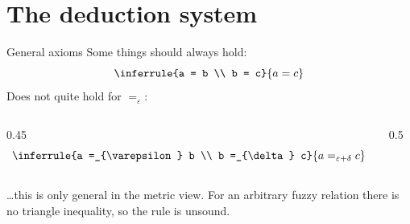 \documentclass[10pt,aspectratio=169]{beamer}
\newcommand{\qeq}[1]{=_{#1}}
\newcommand{\eps}{\varepsilon}
\begin{document}
\section{The deduction system}

\begin{frame}{General axioms}
  Some things should always hold:
  \[
    \inferrule{a = b \\ b = c}{a = c}
  \]
  \vfill
  \pause
  Does not quite hold for $\qeq{\eps}$:
  \begin{columns}[c]
    \begin{column}{0.45\textwidth}
      \[
        \inferrule{a \qeq{\eps} b \\ b \qeq{\delta} c}
                  {a \qeq{\eps + \delta} c}
      \]
    \end{column}
    \begin{column}{0.5\textwidth}
      \centering
    \end{column}
  \end{columns}
  \vfill
  \pause
  \begin{alertblock}{}
    \dots this is only general in the metric view. For an
    arbitrary fuzzy relation there is no triangle inequality, so the
    rule is unsound.
  \end{alertblock}
\end{frame}
\end{document}
